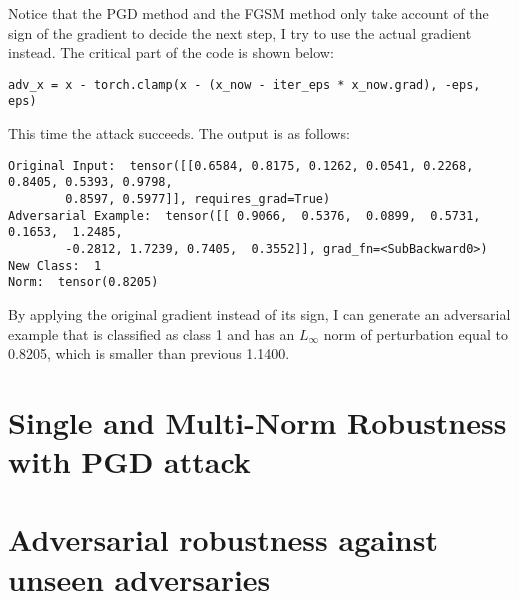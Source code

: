 \documentclass[10pt]{article}
\begin{document}
Notice that the PGD method and the FGSM method only take account of the sign of the gradient to decide the next step, I try to use the actual gradient instead. The critical part of the code is shown below:

\begin{Verbatim}[frame=single]
adv_x = x - torch.clamp(x - (x_now - iter_eps * x_now.grad), -eps, eps)
\end{Verbatim}

This time the attack succeeds. The output is as follows:

\begin{Verbatim}[frame=single]
Original Input:  tensor([[0.6584, 0.8175, 0.1262, 0.0541, 0.2268, 0.8405, 0.5393, 0.9798, 
        0.8597, 0.5977]], requires_grad=True)
Adversarial Example:  tensor([[ 0.9066,  0.5376,  0.0899,  0.5731,  0.1653,  1.2485, 
        -0.2812, 1.7239, 0.7405,  0.3552]], grad_fn=<SubBackward0>)
New Class:  1
Norm:  tensor(0.8205)
\end{Verbatim}

By applying the original gradient instead of its sign, I can generate an adversarial example that is classified as class 1 and has an $L_\infty$ norm of perturbation equal to 0.8205, which is smaller than previous 1.1400.

\newpage
\section{Single and Multi-Norm Robustness with PGD attack}

\subsection{}

\newpage
\subsection{}

\newpage
\section{Adversarial robustness against unseen adversaries}
\end{document}
